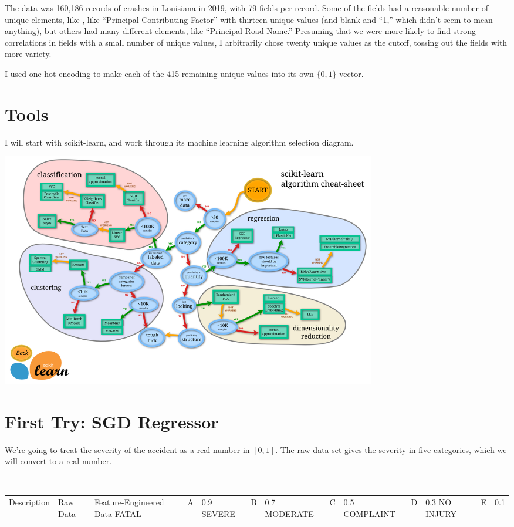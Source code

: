 \documentclass[11pt]{article}
\begin{document}
\begin{spacing}{1.2}
The data was 160,186 records of crashes in Louisiana in 2019, with 79 fields per record.  Some of the fields had a reasonable number of unique elements, like , like ``Principal Contributing Factor'' with thirteen unique values (and blank and ``1,'' which didn't seem to mean anything), but others had many different elements, like ``Principal Road Name.''  Presuming that we were more likely to find strong correlations in fields with a small number of unique values, I arbitrarily chose twenty unique values as the cutoff, tossing out the fields with more variety.  

I used one-hot encoding to make each of the 415 remaining unique values into its own $\{0,1\}$ vector.


\section{Tools}

I will start with scikit-learn, and work through its machine learning algorithm selection diagram.  

\noindent\includegraphics[width=6.5in]{ml_map.png}

\section{First Try: SGD Regressor}

We're going to treat the severity of the accident as a real number in $[0,1]$.  The raw data set gives the severity in five categories, which we will convert to a real number.

\

\hfil\begin{tabular}{llll}
	Description & Raw Data & Feature-Engineered Data \cr\hline
	FATAL & A & 0.9 \cr
	SEVERE & B & 0.7 \cr
	MODERATE & C & 0.5 \cr
	COMPLAINT & D & 0.3 \cr
	NO INJURY & E & 0.1 \cr
\end{tabular}


\end{spacing}
\end{document}
